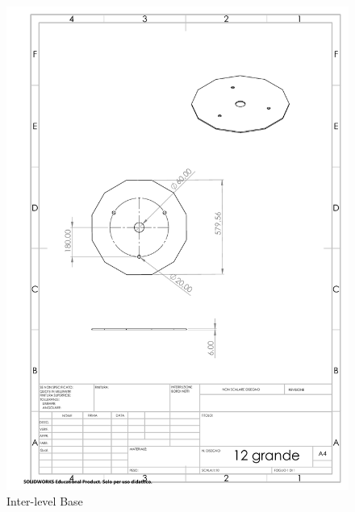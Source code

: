 \documentclass{article}
\begin{document}
\newpage
\begin{figure}[H]
    \centering
    \includegraphics[width=.9\linewidth]{technical_drawings/12_grande.pdf}
    \caption{Inter-level Base}
    \label{fig:12_grande}
\end{figure}
\end{document}
